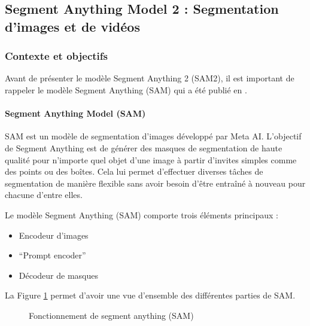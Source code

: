 \subsection{Segment Anything Model 2 : Segmentation d'images et de vidéos}
\label{subsec:sam2_segment_anything_2024}

\subsubsection{Contexte et objectifs}
Avant de présenter le modèle Segment Anything 2 (SAM2), il est important de rappeler le modèle Segment Anything (SAM) qui a été publié en \citeyear{kirillov_segment_2023}.

\paragraph{Segment Anything Model (SAM)}
\label{par:sam_segment_anything_2023}
SAM \cite{kirillov_segment_2023} est un modèle de segmentation d’images développé par Meta AI. L'objectif de Segment Anything est de générer des masques de segmentation de haute qualité pour n'importe quel objet d'une image à partir d'invites simples comme des points ou des boîtes. Cela lui permet d'effectuer diverses tâches de segmentation de manière flexible sans avoir besoin d'être entraîné à nouveau pour chacune d'entre elles.

Le modèle Segment Anything (SAM) comporte trois éléments principaux :
\begin{itemize}
    \item Encodeur d'images
    \item ``Prompt encoder''
    \item Décodeur de masques
\end{itemize}
La Figure \ref{fig:ch2_sam2_01_fonctionnement_sam} permet d’avoir une vue d’ensemble des différentes parties de SAM.

\begin{figure}[H]
    \centering
    \caption{Fonctionnement de segment anything (SAM)}
    \label{fig:ch2_sam2_01_fonctionnement_sam}
\end{figure}

